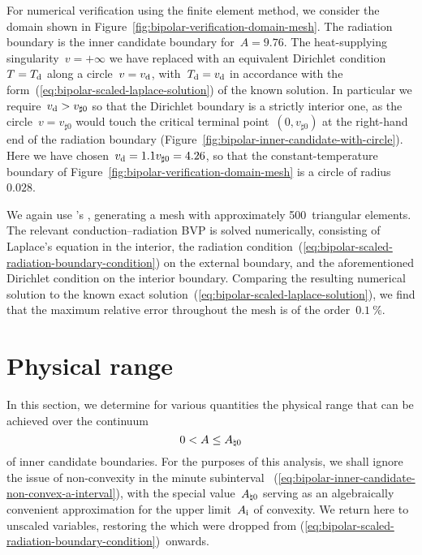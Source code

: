 For numerical verification using the finite element method,
we consider the domain shown
in Figure~\ref{fig:bipolar-verification-domain-mesh}.
The radiation boundary is the inner candidate boundary for~$A = 9.76$.
The heat-supplying singularity~$v = +\infty$
we have replaced with an equivalent Dirichlet condition~$T = T_{\mathrm{d}}$
along a circle~$v = v_{\mathrm{d}}$,
with~$T_{\mathrm{d}} = v_{\mathrm{d}}$ in accordance with
the form~(\ref{eq:bipolar-scaled-laplace-solution})
of the known solution.
In particular we require~$v_{\mathrm{d}} > v_{\sharp 0}$
so that the Dirichlet boundary is a strictly interior one,
as the circle~$v = v_{\sharp 0}$ would touch
the critical terminal point~$(0, v_{\sharp 0})$
at the right-hand end of the radiation boundary
(Figure~\ref{fig:bipolar-inner-candidate-with-circle}).
Here we have chosen~$v_{\mathrm{d}} = 1.1 v_{\sharp 0} = 4.26$,
so that the constant-temperature boundary
of Figure~\ref{fig:bipolar-verification-domain-mesh}
is a circle of radius~$0.028$.

We again use 's ,
generating a mesh with approximately 500~triangular elements.
The relevant conduction--radiation BVP is solved numerically,
consisting of Laplace's equation in the interior,
the radiation condition~(\ref{eq:bipolar-scaled-radiation-boundary-condition})
on the external boundary,
and the aforementioned Dirichlet condition on the interior boundary.
Comparing the resulting numerical solution
to the known exact solution~(\ref{eq:bipolar-scaled-laplace-solution}),
we find that the maximum relative error throughout the mesh
is of the order~$\SI{0.1}{\percent}$.

\section{Physical range}
\label{sec:bipolar.physical}

In this section, we determine for various quantities
the physical range that can be achieved over the continuum
\begin{equation}
  0 < A \le A_{\natural 0}
  \label{eq:bipolar-inner-candidate-existence-interval}
\end{equation}
of inner candidate boundaries.
For the purposes of this analysis,
we shall ignore the issue of non-convexity
in the minute subinterval~%
  (\ref{eq:bipolar-inner-candidate-non-convex-a-interval}),
with the special value~$A_{\natural 0}$
serving as an algebraically convenient approximation
for the upper limit~$A_{\mathrm{i}}$ of convexity.
We return here to unscaled variables,
restoring the \scalingmarks{} which were dropped
from (\ref{eq:bipolar-scaled-radiation-boundary-condition})~onwards.

